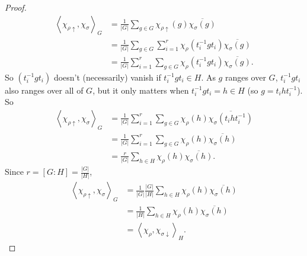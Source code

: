 \documentclass[12pt]{article}
\newcommand\inv[1]{#1^{-1}}
\newcommand{\vbrack}[1]{\left \langle #1 \right \rangle}
\theoremstyle{definition}
\begin{document}
\begin{proof}
    \begin{equation}
        \begin{split}
            \vbrack{ \chi_{\rho \uparrow} , \chi_{\sigma} }_G & = \frac{1}{|G|} \sum\limits_{g \in G} \chi_{\rho \uparrow}(g) \overline{ \chi_{\sigma}(g) } \\
            & = \frac{1}{|G|} \sum\limits_{g \in G} \sum\limits_{i = 1}^r \chi_{\rho} \left( \inv{t_i} g t_i \right) \overline{ \chi_{\sigma}(g) } \\
            & = \frac{1}{|G|} \sum\limits_{i = 1}^r \sum\limits_{g \in G} \chi_{\rho} \left( \inv{t_i} g t_i \right) \overline{ \chi_{\sigma}(g) }.
        \end{split}
    \end{equation}
    So $\left( \inv{t_i} g t_i \right)$ doesn't (necessarily) vanish if $\inv{t_i} g t_i \in H$. As $g$ ranges over $G$, $\inv{t_i} g t_i$ also ranges over all of $G$, but it only matters when $\inv{t_i} g t_i = h \in H$ (so $g = t_i h \inv{t_i}$). So 
    \begin{equation}
        \begin{split}
            \vbrack{ \chi_{\rho \uparrow} , \chi_{\sigma} }_G & = \frac{1}{|G|} \sum\limits_{i = 1}^r \sum\limits_{g \in G} \chi_{\rho}(h) \overline{\chi_{\sigma} \left( t_i h \inv{t_i} \right) } \\
            & = \frac{1}{|G|} \sum\limits_{i = 1}^r \sum\limits_{g \in G} \chi_{\rho}(h) \overline{\chi_{\sigma} (h) } \\
            & = \frac{r}{|G|} \sum\limits_{h \in H} \chi_{\rho}(h) \overline{\chi_{\sigma} (h) }.
        \end{split}
    \end{equation}
    Since $r = [G : H] = \frac{|G|}{|H|}$, 
    \begin{equation}
        \begin{split}
            \vbrack{ \chi_{\rho \uparrow} , \chi_{\sigma} }_G & = \frac{1}{|G|} \frac{|G|}{|H|} \sum\limits_{h \in H} \chi_{\rho}(h) \overline{\chi_{\sigma} (h) } \\
            & = \frac{1}{|H|} \sum\limits_{h \in H} \chi_{\rho}(h) \overline{\chi_{\sigma} (h) } \\
            & = \vbrack{ \chi_{\rho} , \chi_{\sigma \downarrow}}_H.
        \end{split}
    \end{equation}
\end{proof}
\end{document}
